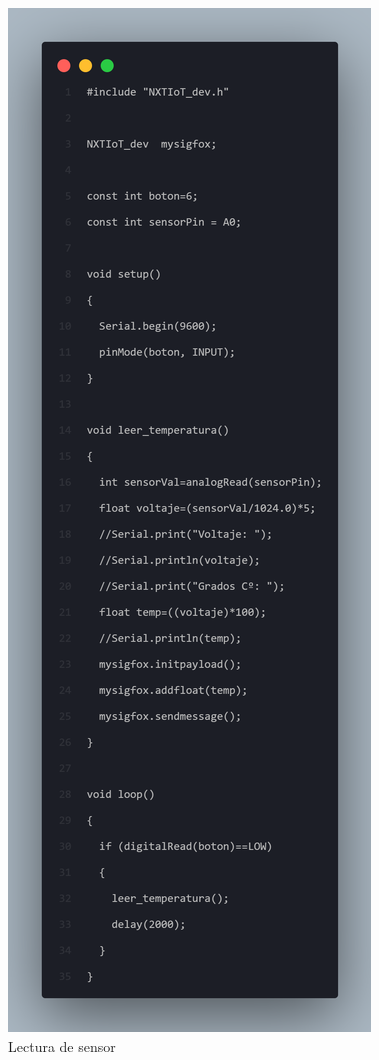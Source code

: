 \documentclass[12pt]{book}
\begin{document}
\begin{figure}
	\centering
	\includegraphics[width=0.7\linewidth, height=1\textheight]{imagenes/arduino}
	\caption{Lectura de sensor}
	\label{fig:Lectura de sensor}
\end{figure} 
\end{document}

